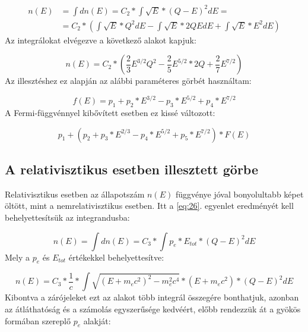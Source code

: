 \begin{align} \label{eq:27}
n \left( E \right)
&=
\int dn \left( E \right)
=
C_{2} * \int \sqrt{E} * \left( Q - E \right)^{2} dE
= \nonumber \\
&=
C_{2} *
\left(
\int \sqrt{E} * Q^2 dE
-
\int \sqrt{E} * 2QE dE
+
\int \sqrt{E} * E^{2} dE
\right)
\end{align}
Az integrálokat elvégezve a következő alakot kapjuk:

\begin{equation} \label{eq:27}
n \left( E \right)
=
C_{2} *
\left(
\frac{2}{3} E^{3/2} Q^{2} - \frac{2}{5} E^{5/2} * 2Q + \frac{2}{7} E^{7/2}
\right)
\end{equation}
Az illesztéshez ez alapján az alábbi paraméteres görbét használtam:

\begin{equation} \label{eq:29}
f \left( E \right)
=
p_{1} + p_{2} * E^{3/2} - p_{3} * E^{5/2} + p_{4} * E^{7/2}
\end{equation}
A Fermi-függvénnyel kibővített esetben ez kissé változott:

\begin{equation} \label{eq:30}
\boxed{
p_{1} + \left( p_{2} + p_{3} * E^{2/3} - p_{4} * E^{5/2} + p_{5} * E^{7/2} \right) * F \left( E \right)
}
\end{equation}


\subsection{A relativisztikus esetben illesztett görbe}
Relativisztikus esetben az állapotszám $n \left( E \right)$ függvénye jóval bonyolultabb képet öltött, mint a nemrelativisztikus esetben. Itt a \ref{eq:26}. egyenlet eredményét kell behelyettesítsük az integrandusba:

\begin{equation} \label{eq:31}
n \left( E \right)
=
\int dn \left( E \right)
=
C_{3} * \int p_{e} * E_{tot} * \left( Q - E \right)^{2} dE
\end{equation}
Mely a $p_{e}$ és $E_{tot}$ értékekkel behelyettesítve:

\begin{equation} \label{eq:32}
n \left( E \right)
=
C_{3} * \frac{1}{c} * \int
\sqrt{\left( E + m_{e} c^{2} \right)^{2} - m_{e}^{2} c^{4}}
*
\left( E + m_{e} c^{2} \right)
*
\left( Q - E \right)^{2} dE
\end{equation}
Kibontva a zárójeleket ezt az alakot több integrál összegére bonthatjuk, azonban az átláthatóság és a számolás egyszerűsége kedvéért, előbb rendezzük át a gyökös formában szereplő $p_{e}$ alakját:

